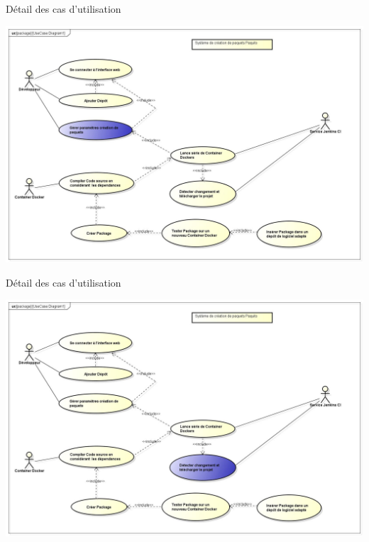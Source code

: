 \documentclass[11pt,xcolor=dvipsnames]{beamer}
\begin{document}
\begin{frame}{Détail des cas d'utilisation}
	\begin{center}	
		\includegraphics[scale=\largeur]{../img/Diagram4.jpg}
	\end{center}
\end{frame}

\begin{frame}{Détail des cas d'utilisation}
	\begin{center}	
		\includegraphics[scale=\largeur]{../img/Diagram5.jpg}
	\end{center}
\end{frame}
\end{document}
